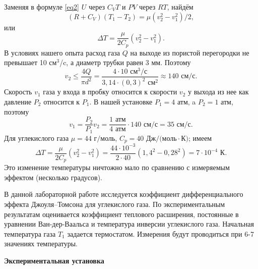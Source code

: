\documentclass[a4paper, 12pt]{article}
\begin{document}
    Заменяя в формуле \eqref{eq2} $U$ через $C_V T$ и $PV$ через $RT$, найдём
    \begin{equation}
        (R + C_V)(T_1 - T_2) = \mu (v_2^2 - v_1^2) / 2,
    \end{equation}
    или
    \begin{equation}
        \Delta T = \frac{\mu}{2 C_p} (v_2^2 - v_1^2).
    \end{equation}
    В условиях нашего опыта расход газа $Q$ на выходе из пористой перегородки не превышает 10 см$^3$/c, а диаметр трубки равен 3 мм. Поэтому
    \begin{equation}
        v_2 \leq \frac{4Q}{\pi d^2} = \frac{4 \cdot 10 \text{ см}^3\text{/с}}{3,14 \cdot (0,3)^2 \text{ см}^2} \approx 140 \text{ см/с}.
    \end{equation}
    Скорость $v_1$ газа у входа в пробку относится к скорости $v_2$ у выхода из нее как давление $P_2$ относится к $P_1$. В нашей установке $P_1 = 4$ атм, a $P_2 = 1$ атм, поэтому
    \begin{equation}
        v_1 = \frac{P_2}{P_1} v_2 = \frac{1 \text{ атм}}{4 \text{ атм}} \cdot 140 \text{ см/с} = 35 \text{ см/с}.
    \end{equation}
    Для углекислого газа $\mu = 44 \text{ г/моль}$, $C_p = 40 \text{ Дж/(моль} \cdot \text{К)}$; имеем
    \begin{equation}
        \Delta T = \frac{\mu}{2 C_p} (v_2^2 - v_1^2) = \frac{44 \cdot 10^{-3}}{2 \cdot 40} (1,4^2 - 0,28^2) = 7 \cdot 10^{-4} \text{ К}.
    \end{equation}
    Это изменение температуры ничтожно мало по сравнению с измеряемым эффектом (несколько градусов).
    
    В данной лабораторной работе исследуется коэффициент дифференциального эффекта Джоуля–Томсона для углекислого газа. По экспериментальным результатам оценивается коэффициент теплового расширения, постоянные в уравнении Ван-дер-Ваальса и температура инверсии углекислого газа. Начальная температура газа $T_1$ задается термостатом. Измерения будут проводиться при 6-7 значениях температуры.
    
    \newpage
    
    \begin{flushleft}
        {\Large {\bf Экспериментальная установка}}
    \end{flushleft}
    
\end{document}
